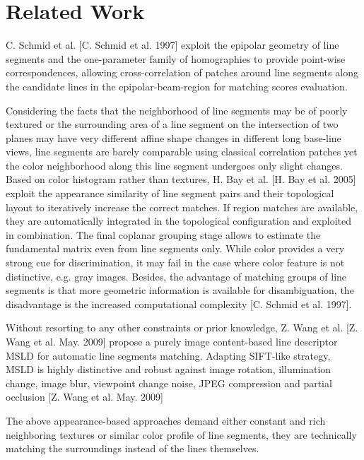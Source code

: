 \section{Related Work}

C. Schmid et al. [C. Schmid et al. 1997] exploit the epipolar geometry of line segments and the one-parameter family of homographies to provide point-wise correspondences, allowing cross-correlation of patches around line segments along the candidate lines in the epipolar-beam-region for matching scores evaluation.

Considering the facts that the neighborhood of line segments may be of poorly textured or the surrounding area of a line segment on the intersection of two planes may have very different affine shape changes in different long base-line views, line segments are barely comparable using classical correlation patches yet the color neighborhood along this line segment undergoes only slight changes. %
Based on color histogram rather than textures, H. Bay et al. [H. Bay et al. 2005] exploit the appearance similarity of line segment pairs and their topological layout to iteratively increase the correct matches. If region matches are available, they are automatically integrated in the topological configuration and exploited in combination. The final coplanar grouping stage allows to estimate the fundamental matrix even from line segments only. While color provides a very strong cue for discrimination, it may fail in the case where color feature is not distinctive, e.g. gray images. Besides, the advantage of matching groups of line segments is that more geometric information is available for disambiguation, the disadvantage is the increased computational complexity [C. Schmid et al. 1997].


Without resorting to any other constraints or prior knowledge, Z. Wang et al. [Z. Wang et al. May. 2009] propose a purely image content-based line descriptor MSLD for automatic line segments matching. Adapting SIFT-like strategy, MSLD is highly distinctive and robust against image rotation, illumination change, image blur, viewpoint change noise, JPEG compression and partial occlusion [Z. Wang et al. May. 2009]

The above appearance-based approaches demand either constant and rich neighboring textures or similar color profile of line segments, they are technically matching the surroundings instead of the lines themselves.

